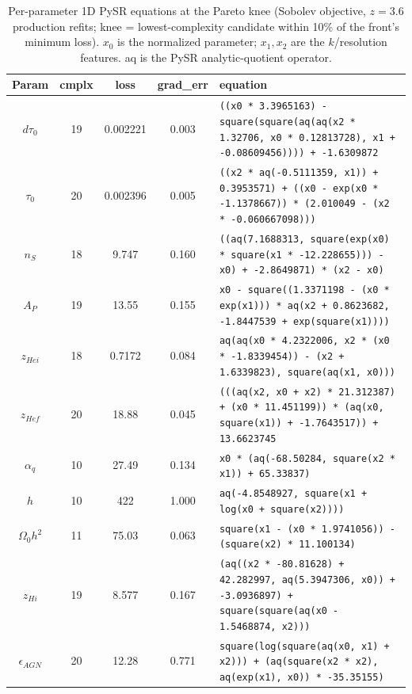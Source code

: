 \begin{table}[!ht]
\caption{\label{tab:eqs} Per-parameter 1D PySR equations at the Pareto knee (Sobolev objective, $z=3.6$ production refits; knee = lowest-complexity candidate within 10\% of the front's minimum loss). $x_0$ is the normalized parameter; $x_1,x_2$ are the $k$/resolution features. aq is the PySR analytic-quotient operator.}
\begin{ruledtabular}\centering
\begin{tabular}{c|ccc|l}
Param & cmplx & loss & grad\_err & equation \\
\hline
$d\tau_0$ & 19 & 0.002221 & 0.003 & \verb|((x0 * 3.3965163) - square(square(aq(aq(x2 * 1.32706, x0 * 0.12813728), x1 + -0.08609456)))) + -1.6309872| \\
$\tau_0$ & 20 & 0.002396 & 0.005 & \verb|((x2 * aq(-0.5111359, x1)) + 0.3953571) + ((x0 - exp(x0 * -1.1378667)) * (2.010049 - (x2 * -0.060667098)))| \\
$n_S$ & 18 & 9.747 & 0.160 & \verb|((aq(7.1688313, square(exp(x0) * square(x1 * -12.228655))) - x0) + -2.8649871) * (x2 - x0)| \\
$A_P$ & 19 & 13.55 & 0.155 & \verb|x0 - square((1.3371198 - (x0 * exp(x1))) * aq(x2 + 0.8623682, -1.8447539 + exp(square(x1))))| \\
$z_{Hei}$ & 18 & 0.7172 & 0.084 & \verb|aq(aq(x0 * 4.2322006, x2 * (x0 * -1.8339454)) - (x2 + 1.6339823), square(aq(x1, x0)))| \\
$z_{Hef}$ & 20 & 18.88 & 0.045 & \verb|(((aq(x2, x0 + x2) * 21.312387) + (x0 * 11.451199)) * (aq(x0, square(x1)) + -1.7643517)) + 13.6623745| \\
$\alpha_q$ & 10 & 27.49 & 0.134 & \verb|x0 * (aq(-68.50284, square(x2 * x1)) + 65.33837)| \\
$h$ & 10 & 422 & 1.000 & \verb|aq(-4.8548927, square(x1 + log(x0 + square(x2))))| \\
$\Omega_0 h^2$ & 11 & 75.03 & 0.063 & \verb|square(x1 - (x0 * 1.9741056)) - (square(x2) * 11.100134)| \\
$z_{Hi}$ & 19 & 8.577 & 0.167 & \verb|(aq((x2 * -80.81628) + 42.282997, aq(5.3947306, x0)) + -3.0936897) + square(square(aq(x0 - 1.5468874, x2)))| \\
$\epsilon_{AGN}$ & 20 & 12.28 & 0.771 & \verb|square(log(square(aq(x0, x1) + x2))) + (aq(square(x2 * x2), aq(exp(x1), x0)) * -35.35155)| \\
\end{tabular}\end{ruledtabular}\end{table}
